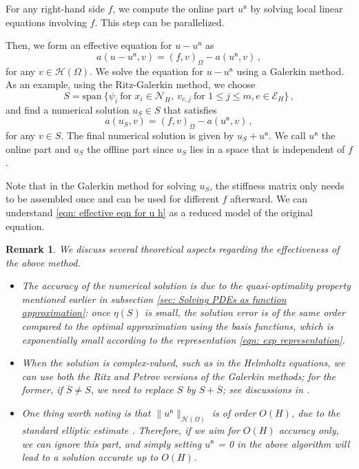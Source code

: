 \documentclass[12pt]{caltech_thesis}
\newtheorem{remark}[theorem]{Remark}
\numberwithin{equation}{section}
\begin{document}
For any right-hand side $f$, we compute the online part $u^\mathsf{n}$ by solving local linear equations involving $f$. This step can be parallelized. 

Then, we form an effective equation for $u-u^\mathsf{n}$ as
\begin{equation}
\label{eqn: effective eqn for u h}
    a(u-u^\mathsf{n},v)=(f,v)_{\Omega}-a(u^\mathsf{n},v)\, ,
\end{equation}
for any $v \in \mathcal{H}(\Omega)$. We solve the equation for $u-u^\mathsf{n}$ using a Galerkin method. As an example, using the Ritz-Galerkin method, we choose 
\[S = \mathrm{span}~\{\psi_i\ \text{for } x_i \in \mathcal{N}_H, \ v_{e,j} \  \text{for } 1\leq j \leq m, e \in \mathcal{E}_H \}\, ,\] 
and find a numerical solution $u_S \in S$
that satisfies
\begin{equation}
\label{eqn: Galerkin}
    a(u_S,v)=(f,v)_{\Omega}-a(u^\mathsf{n},v)\, ,
\end{equation}
for any $v \in S$. The final numerical solution is given by $u_S + u^\mathsf{n}$. We call $u^\mathsf{n}$ the online part and $u_S$ the offline part since $u_S$ lies in a space that is independent of $f$.

Note that in the Galerkin method for solving $u_S$, the stiffness matrix only needs to be assembled once and can be used for different $f$ afterward. We can understand \eqref{eqn: effective eqn for u h} as a reduced model of the original equation.
\begin{remark}
    We discuss several theoretical aspects regarding the effectiveness of the above method.
    \begin{itemize}
        \item The accuracy of the numerical solution is due to the quasi-optimality property mentioned earlier in subsection \ref{sec: Solving PDEs as function approximation}: once $\eta(S)$ is small, the solution error is of the same order compared to the optimal approximation using the basis functions, which is exponentially small according to the representation \eqref{eqn: exp representation}.
        \item When the solution is complex-valued, such as in the Helmholtz equations, we can use both the Ritz and Petrov versions of the Galerkin methods; for the former, if $\overline{S} \neq S$, we need to replace $S$ by $S+\overline{S}$; see discussions in \cite{chen2023exponentially}.
        \item One thing worth noting is that $\|u^\mathsf{n}\|_{\mathcal{H}(\Omega)}$ is of order $O(H)$, due to the standard elliptic estimate \cite{chen2021exponential,chen2023exponentially}. Therefore, if we aim for $O(H)$ accuracy only, we can ignore this part, and simply setting $u^\mathsf{n}$ = 0 in the above algorithm will lead to a solution accurate up to $O(H)$.
    \end{itemize}
\end{remark}
\end{document}
